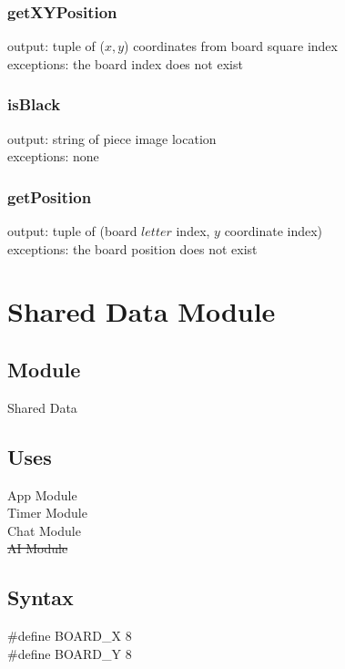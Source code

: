 \documentclass[12pt, titlepage]{article}
\begin{document}
        \subsubsection*{getXYPosition}
            output: tuple of ($x, y$) coordinates from board square index \\ 
            exceptions: the board index does not exist
            
        \subsubsection*{isBlack}
            output: string of piece image location \\ 
            exceptions: none
        
        \subsubsection*{getPosition}
            output: tuple of (board $letter$ index, $y$ coordinate index) \\ 
            exceptions: the board position does not exist

            
\newpage
\section*{Shared Data Module}
    \subsection*{Module}
        Shared Data
    
    \subsection*{Uses}
        App Module \\
        Timer Module \\
        Chat Module \\
        \sout{AI Module}
    
    \subsection*{Syntax}
        \#define BOARD\_X 8\\
        \#define BOARD\_Y 8
        
\end{document}
